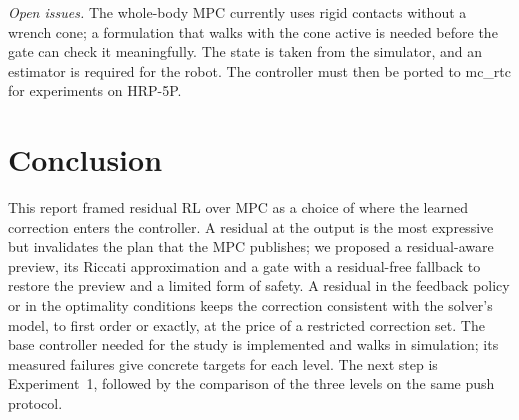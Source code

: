 \documentclass[conference]{IEEEtran}
\begin{document}
\emph{Open issues.} The whole-body MPC currently uses rigid contacts without a wrench cone; a formulation that walks with the cone active is needed before the gate can check it meaningfully.
The state is taken from the simulator, and an estimator is required for the robot.
The controller must then be ported to mc\_rtc for experiments on HRP-5P.

\section{Conclusion}
This report framed residual RL over MPC as a choice of where the learned correction enters the controller.
A residual at the output is the most expressive but invalidates the plan that the MPC publishes; we proposed a residual-aware preview, its Riccati approximation and a gate with a residual-free fallback to restore the preview and a limited form of safety.
A residual in the feedback policy or in the optimality conditions keeps the correction consistent with the solver's model, to first order or exactly, at the price of a restricted correction set.
The base controller needed for the study is implemented and walks in simulation; its measured failures give concrete targets for each level.
The next step is Experiment~1, followed by the comparison of the three levels on the same push protocol.



\end{document}
